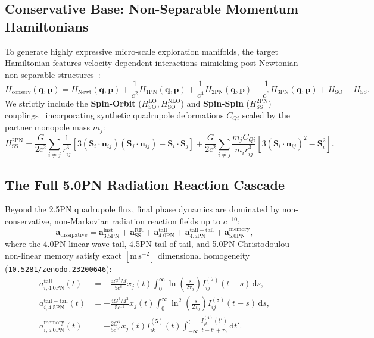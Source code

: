 \documentclass[11pt,a4paper,reqno]{article}
\newcommand{\zenodo}[1]{\href{https://doi.org/10.5281/zenodo.#1}{\texttt{10.5281/zenodo.#1}}}
\theoremstyle{plain}
\theoremstyle{definition}
\theoremstyle{remark}
\numberwithin{equation}{section}
\begin{document}
\subsection{Conservative Base: Non-Separable Momentum Hamiltonians}
To generate highly expressive micro-scale exploration manifolds, the target Hamiltonian features velocity-dependent interactions mimicking post-Newtonian non-separable structures~\cite{DamourJaranowskiSchafer2008}:
\begin{equation}
H_{\mathrm{conserv}}(\bm{q}, \bm{p}) = H_{\mathrm{Newt}}(\bm{q}, \bm{p}) + \frac{1}{c^2} H_{\mathrm{1PN}}(\bm{q}, \bm{p}) + \frac{1}{c^4} H_{\mathrm{2PN}}(\bm{q}, \bm{p}) + \frac{1}{c^6} H_{\mathrm{3PN}}(\bm{q}, \bm{p}) + H_{\mathrm{SO}} + H_{\mathrm{SS}}.
\end{equation}
We strictly include the \textbf{Spin-Orbit} ($H_{\mathrm{SO}}^{\mathrm{LO}}, H_{\mathrm{SO}}^{\mathrm{NLO}}$) and \textbf{Spin-Spin} ($H_{\mathrm{SS}}^{\mathrm{2PN}}$) couplings~\cite{Kidder1995} incorporating synthetic quadrupole deformations $C_{Qi}$ scaled by the partner monopole mass $m_j$:
\begin{equation}
H_{\mathrm{SS}}^{\mathrm{2PN}} = \frac{G}{2 c^2} \sum_{i \neq j} \frac{1}{r_{ij}^3} \left[ 3 (\bm{S}_i \cdot \bm{n}_{ij})(\bm{S}_j \cdot \bm{n}_{ij}) - \bm{S}_i \cdot \bm{S}_j \right] + \frac{G}{2 c^2} \sum_{i \neq j} \frac{m_j C_{Qi}}{m_i r_{ij}^3} \left[ 3 (\bm{S}_i \cdot \bm{n}_{ij})^2 - \bm{S}_i^2 \right].
\end{equation}

\subsection{The Full 5.0PN Radiation Reaction Cascade}
Beyond the 2.5PN quadrupole flux, final phase dynamics are dominated by non-conservative, non-Markovian radiation reaction fields up to $c^{-10}$:
\begin{equation}
\label{eq:diss_field_cascade}
\bm{a}_{\mathrm{dissipative}} = \bm{a}_{3.5\mathrm{PN}}^{\mathrm{inst}} + \bm{a}_{\mathrm{SS}}^{\mathrm{RR}} + \bm{a}_{4.0\mathrm{PN}}^{\mathrm{tail}} + \bm{a}_{4.5\mathrm{PN}}^{\mathrm{tail-tail}} + \bm{a}_{5.0\mathrm{PN}}^{\mathrm{memory}},
\end{equation}
where the 4.0PN linear wave tail, 4.5PN tail-of-tail, and 5.0PN Christodoulou non-linear memory satisfy exact $[\mathrm{m\,s^{-2}}]$ dimensional homogeneity (\zenodo{23200646}):
\begin{align}
a_{i, 4.0\mathrm{PN}}^{\mathrm{tail}}(t) &= -\frac{4 G^2 M}{5 c^8} x_j(t) \int_0^\infty \ln\left( \frac{s}{2 \tau_0} \right) I_{ij}^{(7)}(t - s) \, \mathrm{d}s, \\
a_{i, 4.5\mathrm{PN}}^{\mathrm{tail-tail}}(t) &= -\frac{4 G^3 M^2}{5 c^{11}} x_j(t) \int_0^\infty \ln^2\left( \frac{s}{2 \tau_0} \right) I_{ij}^{(8)}(t - s) \, \mathrm{d}s, \\
a_{i, 5.0\mathrm{PN}}^{\mathrm{memory}}(t) &= -\frac{2 G^2}{5 c^{10}} x_j(t) I_{ik}^{(5)}(t) \int_{-\infty}^{t} \frac{I_{jk}^{(4)}(t')}{t - t' + \tau_0} \, \mathrm{d}t'.
\end{align}
\end{document}
